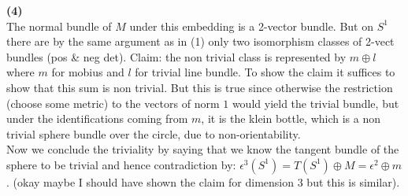 \documentclass{scrartcl}
\begin{document}
\textbf{(4)}\\
The normal bundle of $M$ under this embedding is a 2-vector bundle. But on $S^1$ there are by the same argument as in (1) only two isomorphism classes of 2-vect bundles (pos \& neg det). Claim: the non trivial class is represented by $m \oplus l$ where $m$ for mobius and $l$ for trivial line bundle. To show the claim it suffices to show that this sum is non trivial. But this is true since otherwise the restriction (choose some metric) to the vectors of norm $1$ would yield the trivial bundle, but under the identifications coming from $m$, it is the klein bottle, which is a non trivial sphere bundle over the circle, due to non-orientability. \\
Now we conclude the triviality by saying that we know the tangent bundle of the sphere to be trivial and hence contradiction by: $\epsilon^3(S^1) = T(S^1) \oplus M = \epsilon^2 \oplus m$. (okay maybe I should have shown the claim for dimension 3 but this is similar).
\end{document}
